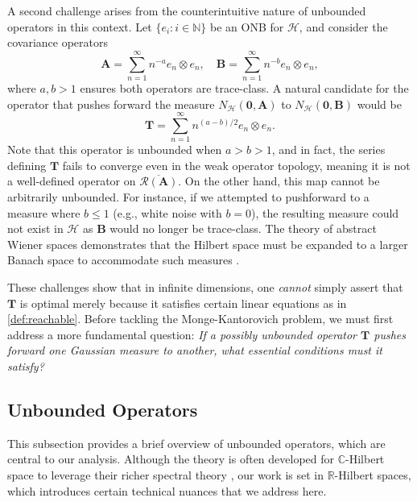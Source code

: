 \documentclass[noinfoline]{imsart}\setcounter{tocdepth}{2}
\renewcommand{\b}[1]{\mathbb{#1}} %
\newcommand{\m}[1]{\mathbf{#1}} %
\renewcommand{\c}[1]{\mathcal{#1}} %
\theoremstyle{plain}
\begin{document}
A second challenge arises from the counterintuitive nature of unbounded operators in this context. Let $\{e_{i} : i \in \b{N} \}$ be an ONB for $\c{H}$, and consider the covariance operators
\begin{equation*}
    \m{A} = \sum_{n = 1}^{\infty} n^{-a} e_{n} \otimes e_{n}, \quad \m{B} = \sum_{n = 1}^{\infty} n^{-b} e_{n} \otimes e_{n},
\end{equation*}
where $a, b > 1$ ensures both operators are trace-class. A natural candidate for the operator that pushes forward the measure $N_{\c{H}}(\m{0}, \m{A})$ to $N_{\c{H}}(\m{0}, \m{B})$ would be
\begin{equation*}
    \m{T} = \sum_{n = 1}^{\infty} n^{(a-b)/2} e_{n} \otimes e_{n}.
\end{equation*}
Note that this operator is unbounded when $a > b > 1$, and in fact, the series defining $\m{T}$ fails to converge even in the weak operator topology, meaning it is not a well-defined operator on $\overline{\c{R}(\m{A})}$. On the other hand, this map cannot be arbitrarily unbounded. For instance, if we attempted to pushforward to a measure where $b \le 1$ (e.g., white noise with $b=0$), the resulting measure could not exist in $\c{H}$ as $\m{B}$ would no longer be trace-class. The theory of abstract Wiener spaces demonstrates that the Hilbert space must be expanded to a larger Banach space to accommodate such measures \cite{gross1967abstract, da2006introduction}.

These challenges show that in infinite dimensions, one \emph{cannot} simply assert that $\m{T}$ is optimal merely because it satisfies certain linear equations as in \cref{def:reachable}. Before tackling the Monge-Kantorovich problem, we must first address a more fundamental question: \emph{If a possibly unbounded operator $\m{T}$ pushes forward one Gaussian measure to another, what essential conditions must it satisfy?}

\subsection{Unbounded Operators}
This subsection provides a brief overview of unbounded operators, which are central to our analysis. Although the theory is often developed for $\b{C}$-Hilbert space to leverage their richer spectral theory \cite{conway2019course, hall2013quantum, reed1980methods, riesz2012functional, kato2013perturbation}, our work is set in $\b{R}$-Hilbert spaces, which introduces certain technical nuances that we address here.
\end{document}
